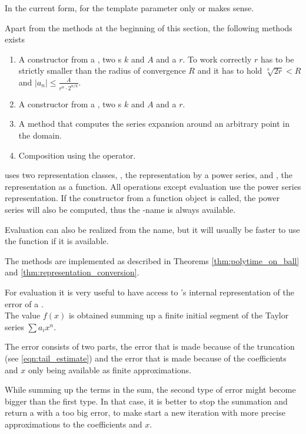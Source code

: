 	  In the current form, for the template parameter  only \real or \complex makes sense. 
		
		Apart from the methods at the beginning of this section, the following methods exists
		\begin{enumerate}
			\item A constructor from a \powerseries, two s $k$ and $A$ and a  $r$.
			To work correctly $r$ has to be strictly smaller than the radius of convergence $R$ 
			and it has to hold $\sqrt[k]{2r} < R$ and $|a_n| \leq \frac{A}{r^n \cdot 2^{n/k}}$.
			\item A constructor from a \func, two s $k$ and $A$ and a  $r$.
			\item A method  that computes the series expansion around
			an arbitrary point in the domain.
			\item Composition using the \code{()} operator.
		\end{enumerate}
		
		\baana uses two representation classes, , the representation by a power series, and , the representation as a function. 
		All operations except evaluation use the power series representation. 
		If the constructor from a function object is called, the power series will also be computed, 
		thus the -name is always available.

		Evaluation can also be realized from the  name, but it will usually be faster 
		to use the function if it is available.

    The methods are implemented as described in Theorems \ref{thm:polytime_on_ball} and \ref{thm:representation_conversion}. 

    For evaluation it is very useful to have access to {\irram}'s internal representation of the error of a \real. \\
    The value $f(x)$ is obtained summing up a finite initial segment of the Taylor series $ \sum a_i x^n $.

    The error consists of two parts, the error that is made because of the truncation (see \ref{eqn:tail_estimate}) and 
    the error that is made because of the coefficients and $x$ only being available as finite approximations. 
    
    While summing up the terms in the sum, the second type of error might become bigger than the first type.
    In that case, it is better to stop the summation and return a \real with a too big error, to make \irram start a new 
    iteration with more precise approximations to the coefficients and $x$.
   
